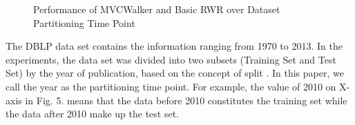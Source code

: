 \documentclass[10pt,journal,compsoc]{IEEEtran}
\begin{document}
\begin{figure}
\centering
{}
\caption{Performance of MVCWalker and Basic RWR over Dataset Partitioning Time Point}
\label{fig:5}       %
\end{figure}

The DBLP data set contains the information ranging from 1970 to 2013. In the experiments, the data set was divided into two subsets (Training Set and Test Set) by the year of publication, based on the concept of split \cite{Baeza-Yates:modern}. In this paper, we call the year as the partitioning time point. For example, the value of 2010 on X-axis in Fig. 5. means that the data before 2010 constitutes the training set while the data after 2010 make up the test set.
\end{document}
